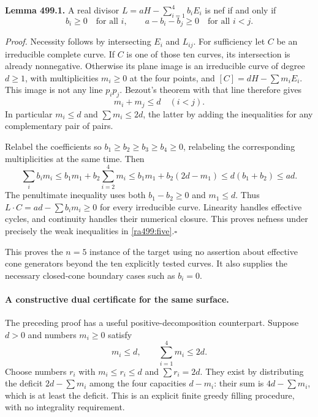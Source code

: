 \documentclass[11pt]{article}
\begin{document}
\textbf{Lemma 499.1.}
A real divisor $L=aH-\sum_{i=1}^4b_iE_i$ is nef if and only if
\begin{equation}\label{ra499:five}
 b_i\ge0\quad\text{for all }i,\qquad
 a-b_i-b_j\ge0\quad\text{for all }i<j.
\end{equation}

\emph{Proof.}
Necessity follows by intersecting $E_i$ and $L_{ij}$. For sufficiency let
$C$ be an irreducible complete curve. If $C$ is one of those ten curves,
its intersection is already nonnegative. Otherwise its plane image is an
irreducible curve of degree $d\ge1$, with multiplicities $m_i\ge0$ at the
four points, and
$[C]=dH-\sum m_iE_i$. This image is not any line $p_ip_j$.
Bezout's theorem with that line therefore gives
\begin{equation}\label{ra499:bezout}
 m_i+m_j\le d\quad(i<j).
\end{equation}
In particular $m_i\le d$ and
$\sum m_i\le2d$, the latter by adding the inequalities for any complementary
pair of pairs.

Relabel the coefficients so $b_1\ge b_2\ge b_3\ge b_4\ge0$, relabeling
the corresponding multiplicities at the same time. Then
\[
 \sum_i b_im_i
 \le b_1m_1+b_2\sum_{i=2}^4m_i
 \le b_1m_1+b_2(2d-m_1)
 \le d(b_1+b_2)\le ad.
\]
The penultimate inequality uses both $b_1-b_2\ge0$ and $m_1\le d$.
Thus $L\cdot C=ad-\sum b_im_i\ge0$ for every irreducible curve.
Linearity handles effective cycles, and continuity handles their numerical
closure. This proves nefness under precisely the weak inequalities in
\eqref{ra499:five}.\hfill$\square$

This proves the $n=5$ instance of the target using no assertion about
effective cone generators beyond the ten explicitly tested curves. It
also supplies the necessary closed-cone boundary cases such as $b_i=0$.

\paragraph{A constructive dual certificate for the same surface.}
The preceding proof has a useful positive-decomposition counterpart.
Suppose $d>0$ and numbers $m_i\ge0$ satisfy
\[
 m_i\le d,\qquad \sum_{i=1}^4m_i\le2d.
\]
Choose numbers $r_i$ with $m_i\le r_i\le d$ and $\sum r_i=2d$.
They exist by distributing the deficit $2d-\sum m_i$ among the four
capacities $d-m_i$: their sum is $4d-\sum m_i$, which is at least the
deficit. This is an explicit finite greedy filling procedure, with no
integrality requirement.
\end{document}
